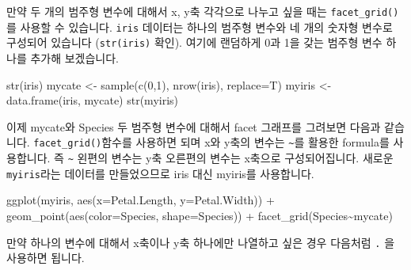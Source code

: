 \documentclass[
]{book}
\newenvironment{Shaded}{\begin{snugshade}}{\end{snugshade}}
\newcommand{\AttributeTok}[1]{\textcolor[rgb]{0.77,0.63,0.00}{#1}}
\newcommand{\DecValTok}[1]{\textcolor[rgb]{0.00,0.00,0.81}{#1}}
\newcommand{\FunctionTok}[1]{\textcolor[rgb]{0.00,0.00,0.00}{#1}}
\newcommand{\NormalTok}[1]{#1}
\newcommand{\OtherTok}[1]{\textcolor[rgb]{0.56,0.35,0.01}{#1}}
\newcommand{\SpecialCharTok}[1]{\textcolor[rgb]{0.00,0.00,0.00}{#1}}
\begin{document}
만약 두 개의 범주형 변수에 대해서 x, y축 각각으로 나누고 싶을 때는 \texttt{facet\_grid()}를 사용할 수 있습니다. \texttt{iris} 데이터는 하나의 범주형 변수와 네 개의 숫자형 변수로 구성되어 있습니다 (\texttt{str(iris)} 확인). 여기에 랜덤하게 0과 1을 갖는 범주형 변수 하나를 추가해 보겠습니다.

\begin{Shaded}
\begin{Highlighting}[]
\FunctionTok{str}\NormalTok{(iris)}
\NormalTok{mycate }\OtherTok{\textless{}{-}} \FunctionTok{sample}\NormalTok{(}\FunctionTok{c}\NormalTok{(}\DecValTok{0}\NormalTok{,}\DecValTok{1}\NormalTok{), }\FunctionTok{nrow}\NormalTok{(iris), }\AttributeTok{replace=}\NormalTok{T)}
\NormalTok{myiris }\OtherTok{\textless{}{-}} \FunctionTok{data.frame}\NormalTok{(iris, mycate)}
\FunctionTok{str}\NormalTok{(myiris)}
\end{Highlighting}
\end{Shaded}

이제 mycate와 Species 두 범주형 변수에 대해서 facet 그래프를 그려보면 다음과 같습니다. \texttt{facet\_grid()}함수를 사용하면 되며 x와 y축의 변수는 \texttt{\textasciitilde{}}를 활용한 formula를 사용합니다. 즉 \texttt{\textasciitilde{}} 왼편의 변수는 y축 오른편의 변수는 x축으로 구성되어집니다. 새로운 \texttt{myiris}라는 데이터를 만들었으므로 iris 대신 myiris를 사용합니다.

\begin{Shaded}
\begin{Highlighting}[]
\FunctionTok{ggplot}\NormalTok{(myiris, }\FunctionTok{aes}\NormalTok{(}\AttributeTok{x=}\NormalTok{Petal.Length, }\AttributeTok{y=}\NormalTok{Petal.Width)) }\SpecialCharTok{+} 
  \FunctionTok{geom\_point}\NormalTok{(}\FunctionTok{aes}\NormalTok{(}\AttributeTok{color=}\NormalTok{Species, }\AttributeTok{shape=}\NormalTok{Species)) }\SpecialCharTok{+}
  \FunctionTok{facet\_grid}\NormalTok{(Species}\SpecialCharTok{\textasciitilde{}}\NormalTok{mycate)}
\end{Highlighting}
\end{Shaded}

만약 하나의 변수에 대해서 x축이나 y축 하나에만 나열하고 싶은 경우 다음처럼 \texttt{.} 을 사용하면 됩니다.
\end{document}
